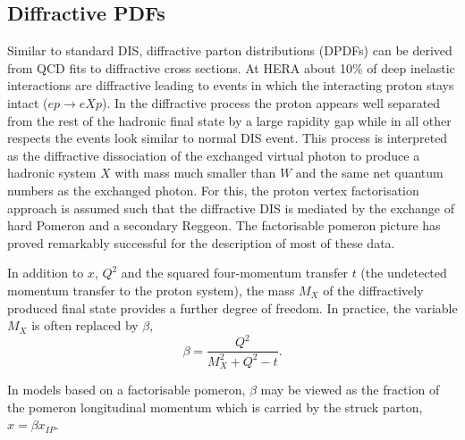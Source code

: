 \subsection{Diffractive PDFs}

\newcommand{\asotp}{\ensuremath{\frac{\alpha_{\rm s}}{2\pi}}}
\newcommand{\Sgl}[1]{\ensuremath{\tilde f_{#1+}}}
\newcommand{\Pom}{{I\!P}}
\newcommand{\Reg}{{I\!R}}
\newcommand{\xpom}{$x_{I\!P}$}


Similar to standard DIS, diffractive parton distributions (DPDFs) 
can be derived from QCD fits to diffractive cross sections.
At HERA about 10\% of deep inelastic interactions are diffractive leading to
events in which the interacting proton stays intact ($ep\to eXp$). 
In the diffractive process the proton appears well separated from the 
rest of the hadronic final state by a large rapidity gap  
while in all other respects the events look similar to normal DIS event.
This process is interpreted as the diffractive dissociation 
of the exchanged virtual photon to produce a hadronic system $X$ with mass much 
smaller than $W$ and the same net quantum numbers as the exchanged photon.
For this, the proton vertex factorisation approach
is assumed such that  the diffractive DIS is mediated by the exchange of hard Pomeron and a
secondary Reggeon.  The factorisable pomeron picture has proved remarkably successful for the description of most of these data.
%

In addition to $x$, $Q^2$ and the squared four-momentum transfer $t$
(the undetected momentum transfer to the proton system),
the mass $M_X$ of the diffractively produced final state provides
 a further degree of freedom. In practice, the variable $M_X$ is often replaced by $\beta$,
\begin{equation}
\beta=\frac{Q^2}{M_X^2+Q^2-t}.
\end{equation}

In models based on a factorisable pomeron, $\beta$ may be viewed as the fraction of the
pomeron longitudinal momentum which is carried by the struck parton, $x=\beta x_{\Pom}$.

